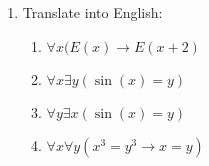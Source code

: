 \documentclass[11pt, a4paper]{article}
\newcommand\setItemNumber[1]{\setcounter{enumi}{\numexpr#1-1\relax}}
\begin{document}
\begin{enumerate}
    \setItemNumber{17}
    \item Translate into English:
        \begin{enumerate}
            \item $\forall x (E(x) \rightarrow E(x + 2)$
            \item $\forall x \exists y(\sin(x) = y)$
            \item $\forall y \exists x(\sin(x) = y)$
            \item $\forall x \forall y(x^3 = y^3 \rightarrow x = y)$
        \end{enumerate}
\end{enumerate}
\end{document}
